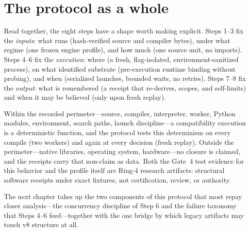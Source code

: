 \section{The protocol as a whole}\label{ch07:whole}

Read together, the eight steps have a shape worth making explicit. Steps 1--3 fix the \emph{inputs}: what runs (hash-verified source and compiler bytes), under what regime (one frozen engine profile), and how much (one source unit, no imports). Steps 4--6 fix the \emph{execution}: where (a fresh, flag-isolated, environment-sanitized process), on what identified substrate (pre-execution runtime binding without probing), and when (serialized launches, bounded waits, no retries). Steps 7--8 fix the \emph{output}: what is remembered (a receipt that re-derives, scopes, and self-limits) and when it may be believed (only upon fresh replay).

\begin{finding}\label{ch07:finding:closure}
Within the recorded perimeter---source, compiler, interpreter, worker, Python modules, environment, search paths, launch discipline---a compatibility execution is a deterministic function, and the protocol tests this determinism on every compile (two workers) and again at every decision (fresh replay). Outside the perimeter---native libraries, operating system, hardware---no closure is claimed, and the receipts carry that non-claim as data. Both the Gate~4 test evidence for this behavior and the profile itself are Ring-4 research artifacts: structural software receipts under exact fixtures, not certification, review, or authority.
\end{finding}

The next chapter takes up the two components of this protocol that most repay closer analysis---the concurrency discipline of Step 6 and the failure taxonomy that Steps 4--6 feed---together with the one bridge by which legacy artifacts may touch v8 structure at all.
